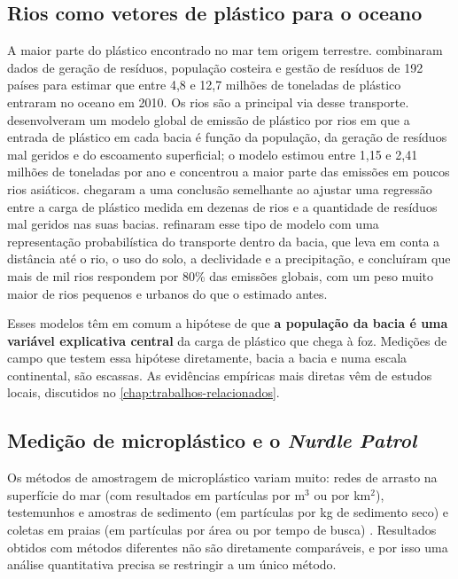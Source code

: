 \subsection{Rios como vetores de plástico para o oceano}

A maior parte do plástico encontrado no mar tem origem terrestre.  combinaram dados de geração de resíduos, população costeira e gestão de resíduos de 192 países para estimar que entre 4,8 e 12,7 milhões de toneladas de plástico entraram no oceano em 2010. Os rios são a principal via desse transporte.  desenvolveram um modelo global de emissão de plástico por rios em que a entrada de plástico em cada bacia é função da população, da geração de resíduos mal geridos e do escoamento superficial; o modelo estimou entre 1,15 e 2,41 milhões de toneladas por ano e concentrou a maior parte das emissões em poucos rios asiáticos.  chegaram a uma conclusão semelhante ao ajustar uma regressão entre a carga de plástico medida em dezenas de rios e a quantidade de resíduos mal geridos nas suas bacias.  refinaram esse tipo de modelo com uma representação probabilística do transporte dentro da bacia, que leva em conta a distância até o rio, o uso do solo, a declividade e a precipitação, e concluíram que mais de mil rios respondem por 80\% das emissões globais, com um peso muito maior de rios pequenos e urbanos do que o estimado antes.

Esses modelos têm em comum a hipótese de que \textbf{a população da bacia é uma variável explicativa central} da carga de plástico que chega à foz. Medições de campo que testem essa hipótese diretamente, bacia a bacia e numa escala continental, são escassas. As evidências empíricas mais diretas vêm de estudos locais, discutidos no \autoref{chap:trabalhos-relacionados}.

\subsection{Medição de microplástico e o \textit{Nurdle Patrol}}

Os métodos de amostragem de microplástico variam muito: redes de arrasto na superfície do mar (com resultados em partículas por m$^3$ ou por km$^2$), testemunhos e amostras de sedimento (em partículas por kg de sedimento seco) e coletas em praias (em partículas por área ou por tempo de busca) \cite{hidalgoruz2012}. Resultados obtidos com métodos diferentes não são diretamente comparáveis, e por isso uma análise quantitativa precisa se restringir a um único método.

